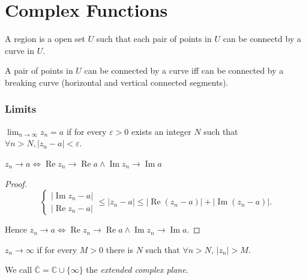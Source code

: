 \section{Complex Functions}

\begin{definition}[region]
	A region is a open set $U$ such that each pair of points in $U$ can be connectd by a curve in $U$.
\end{definition}

\begin{proposition}
	A pair of points in  $U$ can be connected by a curve iff can be connected  by a breaking curve (horizontal and vertical connected segments).
\end{proposition}

\subsubsection{Limits}

\begin{definition}[Limits]
	$\lim_{n \to \infty} z_n = a$ if for every $\varepsilon>0$ exists an integer $N$ such that $\forall n>N, \left| z_n - a \right| <\varepsilon$.
\end{definition}

\begin{proposition}
	$z_n \to a \iff \operatorname{Re} z_n \to  \operatorname{Re} a \land \operatorname{Im}  z_n \to  \operatorname{Im}  a$
\end{proposition}
\begin{proof}

\[
	\begin{cases}
		|\operatorname{Im} z_n - a| \\
		|\operatorname{Re} z_n - a|
	\end{cases}
	\le  |z_n - a| \le \left| \operatorname{Re} \left( z_n - a \right) \right| +\left| \operatorname{Im} \left( z_n - a \right)  \right| 
	.\] 

	Hence $z_n \to a \iff \operatorname{Re} z_n \to  \operatorname{Re} a \land \operatorname{Im}  z_n \to  \operatorname{Im}  a$.
\end{proof}

\begin{definition}[infinity]
	$z_n \to  \infty $ if for every $M>0$ there is $N$ such that $\forall n>N$, $|z_n| >M$.

	We call $\overline{\mathbb{C}}  = \mathbb{C} \cup  \{\infty \} $ the \textit{extended complex plane}.
\end{definition}

